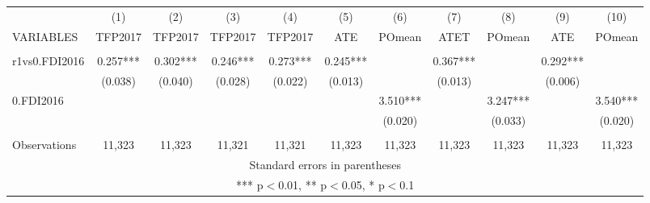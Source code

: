 \documentclass[]{article}
\begin{document}
\begin{tabular}{lcccccccccc} \hline
 & (1) & (2) & (3) & (4) & (5) & (6) & (7) & (8) & (9) & (10) \\
VARIABLES & TFP2017 & TFP2017 & TFP2017 & TFP2017 & ATE & POmean & ATET & POmean & ATE & POmean \\ \hline
 &  &  &  &  &  &  &  &  &  &  \\
r1vs0.FDI2016 & 0.257*** & 0.302*** & 0.246*** & 0.273*** & 0.245*** &  & 0.367*** &  & 0.292*** &  \\
 & (0.038) & (0.040) & (0.028) & (0.022) & (0.013) &  & (0.013) &  & (0.006) &  \\
0.FDI2016 &  &  &  &  &  & 3.510*** &  & 3.247*** &  & 3.540*** \\
 &  &  &  &  &  & (0.020) &  & (0.033) &  & (0.020) \\
 &  &  &  &  &  &  &  &  &  &  \\
 Observations & 11,323 & 11,323 & 11,321 & 11,321 & 11,323 & 11,323 & 11,323 & 11,323 & 11,323 & 11,323 \\ \hline
\multicolumn{11}{c}{ Standard errors in parentheses} \\
\multicolumn{11}{c}{ *** p$<$0.01, ** p$<$0.05, * p$<$0.1} \\
\end{tabular}
\end{document}
